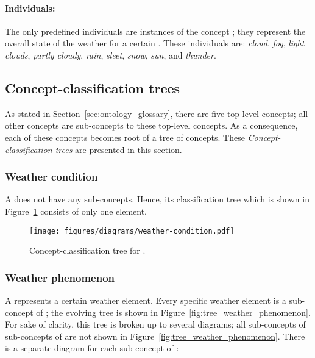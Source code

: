 \paragraph{Individuals:}

The only predefined individuals are instances of the concept ; they represent the overall state of the weather for a certain . These individuals are: \emph{cloud}, \emph{fog}, \emph{light clouds}, \emph{partly cloudy}, \emph{rain}, \emph{sleet}, \emph{snow}, \emph{sun}, and \emph{thunder}.

\subsection{Concept-classification trees}
\label{sec:concept_classification_trees}

As stated in Section~\ref{sec:ontology_glossary}, there are five top-level concepts; all other concepts are sub-concepts to these top-level concepts. As a consequence, each of these concepts becomes root of a tree of concepts. These \emph{Concept-classification trees} are presented in this section.

\subsubsection{Weather condition}

A  does not have any sub-concepts. Hence, its classification tree which is shown in Figure~\ref{fig:tree_weather_condition} consists of only one element.

\begin{figure}
  \centering
  \texttt{[image: figures/diagrams/weather-condition.pdf]}
  \caption[Concept-classification tree for ]{Concept-classification tree for .}
  \label{fig:tree_weather_condition}
\end{figure}

\subsubsection{Weather phenomenon}

A  represents a certain weather element. Every specific weather element is a sub-concept of ; the evolving tree is shown in Figure~\ref{fig:tree_weather_phenomenon}. For sake of clarity, this tree is broken up to several diagrams; all sub-concepts of sub-concepts of  are not shown in Figure~\ref{fig:tree_weather_phenomenon}. There is a separate diagram for each sub-concept of :


